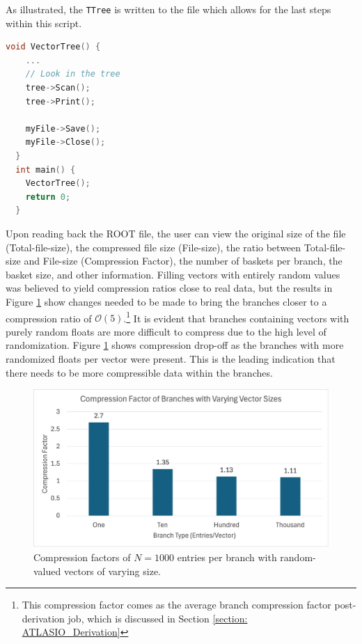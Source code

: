 As illustrated, the \verb|TTree| is written to the file which allows for the last steps within this script. 

\begin{lstlisting}[language=C]  
  void VectorTree() {
    ...
    // Look in the tree
    tree->Scan();
    tree->Print();

    myFile->Save();
    myFile->Close();
  }
  int main() {
    VectorTree();
    return 0;
  } 
\end{lstlisting}

Upon reading back the ROOT file, the user can view the original size of the file (Total-file-size), the compressed file size (File-size), the ratio between Total-file-size and File-size (Compression Factor), the number of baskets per branch, the basket size, and other information. 
Filling vectors with entirely random values was believed to yield compression ratios close to real data, but the results in Figure \ref{fig:toymodel_compF_rndm_vectors} show changes needed to be made to bring the branches closer to a compression ratio of $\mathcal{O}(5)$.\footnote{This compression factor comes as the average branch compression factor post-derivation job, which is discussed in Section \ref{section: ATLASIO_Derivation}} 
It is evident that branches containing vectors with purely random floats are more difficult to compress due to the high level of randomization.
Figure \ref{fig:toymodel_compF_rndm_vectors} shows compression drop-off as the branches with more randomized floats per vector were present.
This is the leading indication that there needs to be more compressible data within the branches. 
\vspace{20px}
\begin{figure}[h]
    \centering
    \includegraphics[width=.8\textwidth]{content/toymodel_content/branch_compfacts_nomix.png}
    \caption{Compression factors of $N=1000$ entries per branch with random-valued vectors of varying size.}
    \label{fig:toymodel_compF_rndm_vectors}
\end{figure}
\vspace{10px}

